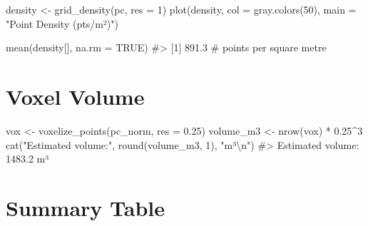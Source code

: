 \documentclass[
  11pt,
  letterpaper,
  DIV=11,
  numbers=noendperiod]{scrreprt}
\newenvironment{Shaded}{\begin{snugshade}}{\end{snugshade}}
\newcommand{\AttributeTok}[1]{\textcolor[rgb]{0.40,0.45,0.13}{#1}}
\newcommand{\CommentTok}[1]{\textcolor[rgb]{0.37,0.37,0.37}{#1}}
\newcommand{\ConstantTok}[1]{\textcolor[rgb]{0.56,0.35,0.01}{#1}}
\newcommand{\DecValTok}[1]{\textcolor[rgb]{0.68,0.00,0.00}{#1}}
\newcommand{\FloatTok}[1]{\textcolor[rgb]{0.68,0.00,0.00}{#1}}
\newcommand{\FunctionTok}[1]{\textcolor[rgb]{0.28,0.35,0.67}{#1}}
\newcommand{\NormalTok}[1]{\textcolor[rgb]{0.00,0.23,0.31}{#1}}
\newcommand{\OtherTok}[1]{\textcolor[rgb]{0.00,0.23,0.31}{#1}}
\newcommand{\SpecialCharTok}[1]{\textcolor[rgb]{0.37,0.37,0.37}{#1}}
\newcommand{\StringTok}[1]{\textcolor[rgb]{0.13,0.47,0.30}{#1}}
\begin{document}
\begin{Shaded}
\begin{Highlighting}[]
\NormalTok{density }\OtherTok{\textless{}{-}} \FunctionTok{grid\_density}\NormalTok{(pc, }\AttributeTok{res =} \DecValTok{1}\NormalTok{)}
\FunctionTok{plot}\NormalTok{(density, }\AttributeTok{col =} \FunctionTok{gray.colors}\NormalTok{(}\DecValTok{50}\NormalTok{), }\AttributeTok{main =} \StringTok{"Point Density (pts/m²)"}\NormalTok{)}

\FunctionTok{mean}\NormalTok{(density[], }\AttributeTok{na.rm =} \ConstantTok{TRUE}\NormalTok{)}
\CommentTok{\#\textgreater{} [1] 891.3   \# points per square metre}
\end{Highlighting}
\end{Shaded}

\section{Voxel Volume}\label{voxel-volume}

\begin{Shaded}
\begin{Highlighting}[]
\NormalTok{vox        }\OtherTok{\textless{}{-}} \FunctionTok{voxelize\_points}\NormalTok{(pc\_norm, }\AttributeTok{res =} \FloatTok{0.25}\NormalTok{)}
\NormalTok{volume\_m3  }\OtherTok{\textless{}{-}} \FunctionTok{nrow}\NormalTok{(vox) }\SpecialCharTok{*} \FloatTok{0.25}\SpecialCharTok{\^{}}\DecValTok{3}
\FunctionTok{cat}\NormalTok{(}\StringTok{"Estimated volume:"}\NormalTok{, }\FunctionTok{round}\NormalTok{(volume\_m3, }\DecValTok{1}\NormalTok{), }\StringTok{"m³}\SpecialCharTok{\textbackslash{}n}\StringTok{"}\NormalTok{)}
\CommentTok{\#\textgreater{} Estimated volume: 1483.2 m³}
\end{Highlighting}
\end{Shaded}

\section{Summary Table}\label{summary-table-1}
\end{document}
